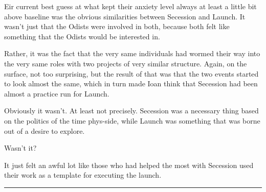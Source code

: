 Eir current best guess at what kept their anxiety level always at least a little bit above baseline was the obvious similarities between Secession and Launch. It wasn't just that the Odists were involved in both, because both felt like something that the Odists would be interested in.

Rather, it was the fact that the very same individuals had wormed their way into the very same roles with two projects of very similar structure. Again, on the surface, not too surprising, but the result of that was that the two events started to look almost the same, which in turn made Ioan think that Secession had been almost a practice run for Launch.

Obviously it wasn't. At least not precisely. Secession was a necessary thing based on the politics of the time phys-side, while Launch was something that was borne out of a desire to explore.

Wasn't it?

It just felt an awful lot like those who had helped the most with Secession used their work as a template for executing the launch.

\begin{center}\rule{0.5\linewidth}{0.5pt}\end{center}

